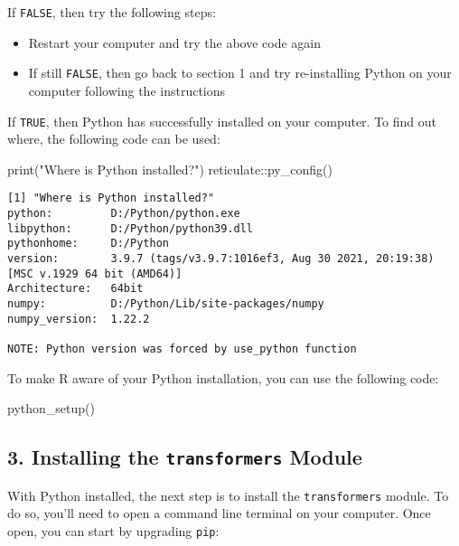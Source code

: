 \documentclass[
]{article}
\newenvironment{Shaded}{\begin{snugshade}}{\end{snugshade}}
\newcommand{\FunctionTok}[1]{\textcolor[rgb]{0.00,0.00,0.00}{#1}}
\newcommand{\NormalTok}[1]{#1}
\newcommand{\SpecialCharTok}[1]{\textcolor[rgb]{0.00,0.00,0.00}{#1}}
\newcommand{\StringTok}[1]{\textcolor[rgb]{0.31,0.60,0.02}{#1}}
\begin{document}
If \texttt{FALSE}, then try the following steps:

\begin{itemize}
\item
  Restart your computer and try the above code again
\item
  If still \texttt{FALSE}, then go back to section 1 and try
  re-installing Python on your computer following the instructions
\end{itemize}

If \texttt{TRUE}, then Python has successfully installed on your
computer. To find out where, the following code can be used:

\begin{Shaded}
\begin{Highlighting}[]
\FunctionTok{print}\NormalTok{(}\StringTok{"Where is Python installed?"}\NormalTok{)}
\NormalTok{reticulate}\SpecialCharTok{::}\FunctionTok{py\_config}\NormalTok{()}
\end{Highlighting}
\end{Shaded}

\begin{verbatim}
[1] "Where is Python installed?"
python:         D:/Python/python.exe
libpython:      D:/Python/python39.dll
pythonhome:     D:/Python
version:        3.9.7 (tags/v3.9.7:1016ef3, Aug 30 2021, 20:19:38) [MSC v.1929 64 bit (AMD64)]
Architecture:   64bit
numpy:          D:/Python/Lib/site-packages/numpy
numpy_version:  1.22.2

NOTE: Python version was forced by use_python function
\end{verbatim}

To make R aware of your Python installation, you can use the following
code:

\begin{Shaded}
\begin{Highlighting}[]
\FunctionTok{python\_setup}\NormalTok{()}
\end{Highlighting}
\end{Shaded}

\hypertarget{installing-the-transformers-module}{%
\subsection{\texorpdfstring{3. Installing the \texttt{transformers}
Module}{3. Installing the transformers Module}}\label{installing-the-transformers-module}}

With Python installed, the next step is to install the
\texttt{transformers} module. To do so, you'll need to open a command
line terminal on your computer. Once open, you can start by upgrading
\texttt{pip}:
\end{document}
